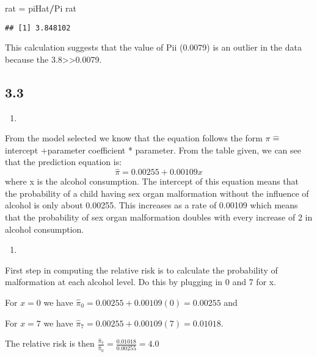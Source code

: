 \documentclass[
]{article}
\newenvironment{Shaded}{\begin{snugshade}}{\end{snugshade}}
\newcommand{\NormalTok}[1]{#1}
\newcommand{\OperatorTok}[1]{\textcolor[rgb]{0.81,0.36,0.00}{\textbf{#1}}}
\newcommand{\StringTok}[1]{\textcolor[rgb]{0.31,0.60,0.02}{#1}}
\begin{document}
\begin{Shaded}
\begin{Highlighting}[]
\NormalTok{rat =}\StringTok{ }\NormalTok{piHat}\OperatorTok{/}\NormalTok{Pi}
\NormalTok{rat}
\end{Highlighting}
\end{Shaded}

\begin{verbatim}
## [1] 3.848102
\end{verbatim}

This calculation suggests that the value of Pii (0.0079) is an outlier
in the data because the 3.8\textgreater\textgreater0.0079.

\hypertarget{section-1}{%
\subsection{3.3}\label{section-1}}

\begin{enumerate}
\def\labelenumi{\alph{enumi})}
\item
\end{enumerate}

From the model selected we know that the equation follows the form
\(\pi \hat =\) intercept +parameter coefficient * parameter. From the
table given, we can see that the prediction equation is:
\[ \hat \pi  =0.00255 +0.00109x  \] where x is the alcohol consumption.
The intercept of this equation means that the probability of a child
having sex organ malformation without the influence of alcohol is only
about 0.00255. This increases as a rate of 0.00109 which means that the
probability of sex organ malformation doubles with every increase of 2
in alcohol consumption.

\begin{enumerate}
\def\labelenumi{\alph{enumi})}
\setcounter{enumi}{1}
\item
\end{enumerate}

First step in computing the relative risk is to calculate the
probability of malformation at each alcohol level. Do this by plugging
in 0 and 7 for x.

For \(x=0\) we have \(\hat \pi_0 = 0.00255 +0.00109(0) =0.00255\) and

For \(x=7\) we have \(\hat \pi_7 = 0.00255 +0.00109(7)=0.01018\).

The relative risk is then
\(\frac{\hat\pi_7}{\hat \pi_0}=\frac{0.01018}{0.00255}=4.0\)
\end{document}

